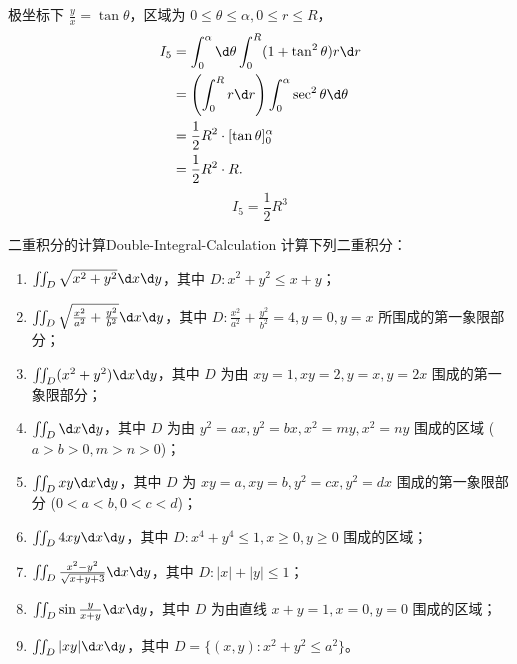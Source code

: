 \begin{solution}
    极坐标下 $\frac{y}{x} = \tan \theta$，区域为 $0 \le \theta \le \alpha, 0 \le r \le R$，
    \begin{equation}
        \begin{aligned}
            I_5 & = \int_{0}^{\alpha} \d \theta \int_{0}^{R} (1 + \tan^2 \theta) r \d r          \\
                & = \left( \int_{0}^{R} r \d r \right) \int_{0}^{\alpha} \sec^2 \theta \d \theta \\
                & = \frac{1}{2} R^2 \cdot [ \tan \theta ]_0^{\alpha}                             \\
                & = \frac{1}{2} R^2 \cdot R.
        \end{aligned}
    \end{equation}
    \begin{equation}
        I_5 = \boxed{\frac{1}{2} R^3}
    \end{equation}
\end{solution}


\begin{problem}{二重积分的计算}{Double-Integral-Calculation}
    计算下列二重积分：
    \begin{enumerate}
        \item $\iint_{D} \sqrt{x^{2}+y^{2}} \d x \d y$，其中 $D: x^{2}+y^{2} \leqslant x+y$；
        \item $\iint_{D} \sqrt{\frac{x^{2}}{a^{2}}+\frac{y^{2}}{b^{2}}} \d x \d y$，其中 $D: \frac{x^{2}}{a^{2}}+\frac{y^{2}}{b^{2}}=4, y=0, y=x$ 所围成的第一象限部分；
        \item $\iint_{D} (x^{2}+y^{2}) \d x \d y$，其中 $D$ 为由 $xy=1, xy=2, y=x, y=2x$ 围成的第一象限部分；
        \item $\iint_{D} \d x \d y$，其中 $D$ 为由 $y^{2}=ax, y^{2}=bx, x^{2}=my, x^{2}=ny$ 围成的区域 ($a>b>0, m>n>0$)；
        \item $\iint_{D} xy \d x \d y$，其中 $D$ 为 $xy=a, xy=b, y^{2}=cx, y^{2}=dx$ 围成的第一象限部分 ($0<a<b, 0<c<d$)；
        \item $\iint_{D} 4xy \d x \d y$，其中 $D: x^{4}+y^{4} \leqslant 1, x \geqslant 0, y \geqslant 0$ 围成的区域；
        \item $\iint_{D} \frac{x^{2}-y^{2}}{\sqrt{x+y+3}} \d x \d y$，其中 $D: |x|+|y| \leqslant 1$；
        \item $\iint_{D} \sin \frac{y}{x+y} \d x \d y$，其中 $D$ 为由直线 $x+y=1, x=0, y=0$ 围成的区域；
        \item $\iint_{D} |xy| \d x \d y$，其中 $D = \{(x,y) : x^2 + y^2 \leqslant a^2\}$。
    \end{enumerate}
\end{problem}

